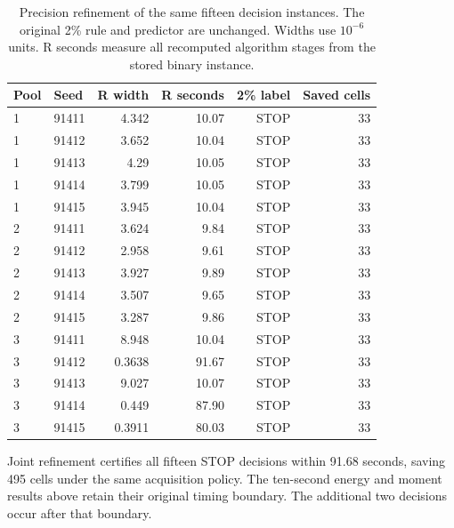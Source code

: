 \begin{table}[t]\centering\small
\caption{Precision refinement of the same fifteen decision instances. The original 2\% rule and predictor are unchanged. Widths use $10^{-6}$ units. R seconds measure all recomputed algorithm stages from the stored binary instance.}\label{tab:decisions-refined-v92}
\begin{tabular}{llrrrr}\toprule Pool&Seed&R width&R seconds&2\% label&Saved cells\\\midrule
1 & 91411 & 4.342 & 10.07 & STOP & 33\\
1 & 91412 & 3.652 & 10.04 & STOP & 33\\
1 & 91413 & 4.29 & 10.05 & STOP & 33\\
1 & 91414 & 3.799 & 10.05 & STOP & 33\\
1 & 91415 & 3.945 & 10.04 & STOP & 33\\
2 & 91411 & 3.624 & 9.84 & STOP & 33\\
2 & 91412 & 2.958 & 9.61 & STOP & 33\\
2 & 91413 & 3.927 & 9.89 & STOP & 33\\
2 & 91414 & 3.507 & 9.65 & STOP & 33\\
2 & 91415 & 3.287 & 9.86 & STOP & 33\\
3 & 91411 & 8.948 & 10.04 & STOP & 33\\
3 & 91412 & 0.3638 & 91.67 & STOP & 33\\
3 & 91413 & 9.027 & 10.07 & STOP & 33\\
3 & 91414 & 0.449 & 87.90 & STOP & 33\\
3 & 91415 & 0.3911 & 80.03 & STOP & 33\\
\bottomrule\end{tabular}\end{table}
Joint refinement certifies all fifteen STOP decisions within 91.68 seconds, saving 495 cells under the same acquisition policy. The ten-second energy and moment results above retain their original timing boundary. The additional two decisions occur after that boundary.
